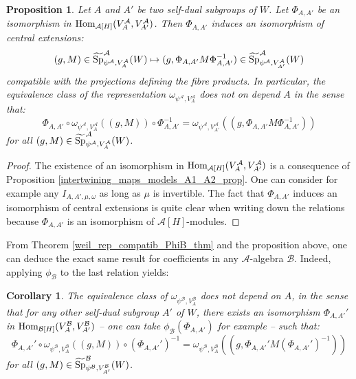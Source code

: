 \documentclass[11pt]{article}
\theoremstyle{plain}
\newtheorem{cor}[theo]{Corollary}
\newtheorem{prop}[theo]{Proposition}
\theoremstyle{definition}
\theoremstyle{plain}
\theoremstyle{definition}
\theoremstyle{plain}
\begin{document}
\begin{prop} Let $A$ and $A'$ be two self-dual subgroups of $W$. Let $\Phi_{A,A'}$ be an isomorphism in $\textup{Hom}_{\mathcal{A}[H]}(V_A^\mathcal{A},V_{A'}^\mathcal{A})$. Then $\Phi_{A,A'}$ induces an isomorphism of central extensions:
$$(g,M) \in \widetilde{\textup{Sp}}_{\psi^\mathcal{A},V_A^\mathcal{A}}^\mathcal{A}(W) \mapsto (g,\Phi_{A,A'} M \Phi_{A,A'}^{-1}) \in \widetilde{\textup{Sp}}_{\psi^\mathcal{A},V_{A'}^\mathcal{A}}^\mathcal{A}(W)$$
compatible with the projections defining the fibre products. In particular, the equivalence class of the representation $\omega_{\psi^\mathcal{A},V_A^\mathcal{A}}$ does not on depend $A$ in the sense that:
$$\Phi_{A,A'} \circ \omega_{\psi^\mathcal{A},V_A^\mathcal{A}}((g,M)) \circ \Phi_{A,A'}^{-1}=\omega_{\psi^\mathcal{A},V_{A'}^\mathcal{A}}((g,\Phi_{A,A'} M \Phi_{A,A'}^{-1}))$$
for all $(g,M) \in \widetilde{\textup{Sp}}_{\psi^\mathcal{A},V_A^\mathcal{A}}^\mathcal{A}(W)$. \end{prop}

\begin{proof} The existence of an isomorphism in $\textup{Hom}_{\mathcal{A}[H]}(V_A^\mathcal{A},V_{A'}^\mathcal{A})$ is a consequence of Proposition \ref{intertwining_maps_models_A1_A2_prop}. One can consider for example any $I_{A,A',\mu,\omega}$ as long as $\mu$ is invertible. The fact that $\Phi_{A,A'}$ induces an isomorphism of central extensions is quite clear when writing down the relations because $\Phi_{A,A'}$ is an isomorphism of $\mathcal{A}[H]$-modules. \end{proof}

From Theorem \ref{weil_rep_compatib_PhiB_thm} and the proposition above, one can deduce the exact same result for coefficients in any $\mathcal{A}$-algebra $\mathcal{B}$. Indeed, applying $\phi_\mathcal{B}$ to the last relation yields:

\begin{cor} \label{canonical_identif_central_ext_B_cor} The equivalence class of $\omega_{\psi^\mathcal{B},V_A^\mathcal{B}}$ does not depend on $A$, in the sense that for any other self-dual subgroup $A'$ of $W$, there exists an isomorphism $\Phi_{A,A'}'$ in $\textup{Hom}_{\mathcal{B}[H]}(V_A^\mathcal{B},V_{A'}^\mathcal{B})$  -- one can take $\phi_\mathcal{B} (\Phi_{A,A'})$ for example -- such that:
$$\Phi_{A,A'}' \circ \omega_{\psi^\mathcal{B},V_A^\mathcal{B}}((g,M)) \circ (\Phi_{A,A'}')^{-1}=\omega_{\psi^\mathcal{B},V_A^\mathcal{B}}((g, \Phi_{A,A'}' M (\Phi_{A,A'}')^{-1}))$$
for all $(g,M) \in \widetilde{\textup{Sp}}_{\psi^\mathcal{B},V_{A'}^\mathcal{B}}^\mathcal{B}(W)$. \end{cor}
\end{document}
